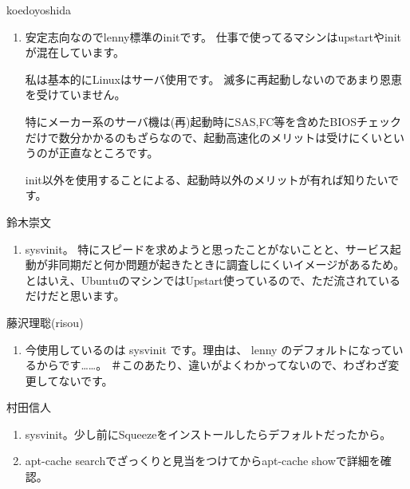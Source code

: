 \begin{prework}{ koedoyoshida }

\begin{enumerate}
\item 安定志向なのでlenny標準のinitです。
仕事で使ってるマシンはupstartやinitが混在しています。

私は基本的にLinuxはサーバ使用です。
滅多に再起動しないのであまり恩恵を受けていません。

特にメーカー系のサーバ機は(再)起動時にSAS,FC等を含めたBIOSチェックだけで数分かかるのもざらなので、起動高速化のメリットは受けにくいというのが正直なところです。

init以外を使用することによる、起動時以外のメリットが有れば知りたいです。

\end{enumerate}

\end{prework}



\begin{prework}{ 鈴木崇文 }
\begin{enumerate}
\item sysvinit。
特にスピードを求めようと思ったことがないことと、サービス起動が非同期だと何か問題が起きたときに調査しにくいイメージがあるため。
とはいえ、UbuntuのマシンではUpstart使っているので、ただ流されているだけだと思います。
\end{enumerate}

\end{prework}



\begin{prework}{ 藤沢理聡(risou) }
\begin{enumerate}
\item 今使用しているのは sysvinit です。理由は、 lenny のデフォルトになっているからです……。
＃このあたり、違いがよくわかってないので、わざわざ変更してないです。
\end{enumerate}

\end{prework}



\begin{prework}{ 村田信人 }

\begin{enumerate}
\item sysvinit。少し前にSqueezeをインストールしたらデフォルトだったから。
\item  apt-cache searchでざっくりと見当をつけてからapt-cache showで詳細を確認。
\end{enumerate}
\end{prework}

